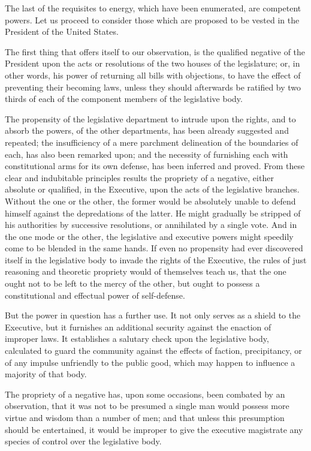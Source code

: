 The last of the requisites to energy, which have been enumerated, are competent powers. 
Let us proceed to consider those which are proposed to be vested in the President of the United States.

The first thing that offers itself to our observation, is the qualified negative of the President upon the acts or resolutions of the two houses of the legislature; or, in other words, his power of returning all bills with objections, to have the effect of preventing their becoming laws, unless they should afterwards be ratified by two thirds of each of the component members of the legislative body.

The propensity of the legislative department to intrude upon the rights, and to absorb the powers, of the other departments, has been already suggested and repeated; the insufficiency of a mere parchment delineation of the boundaries of each, has also been remarked upon; and the necessity of furnishing each with constitutional arms for its own defense, has been inferred and proved. 
From these clear and indubitable principles results the propriety of a negative, either absolute or qualified, in the Executive, upon the acts of the legislative branches. 
Without the one or the other, the former would be absolutely unable to defend himself against the depredations of the latter. 
He might gradually be stripped of his authorities by successive resolutions, or annihilated by a single vote. 
And in the one mode or the other, the legislative and executive powers might speedily come to be blended in the same hands. 
If even no propensity had ever discovered itself in the legislative body to invade the rights of the Executive, the rules of just reasoning and theoretic propriety would of themselves teach us, that the one ought not to be left to the mercy of the other, but ought to possess a constitutional and effectual power of self-defense.

But the power in question has a further use. 
It not only serves as a shield to the Executive, but it furnishes an additional security against the enaction of improper laws. 
It establishes a salutary check upon the legislative body, calculated to guard the community against the effects of faction, precipitancy, or of any impulse unfriendly to the public good, which may happen to influence a majority of that body.

The propriety of a negative has, upon some occasions, been combated by an observation, that it was not to be presumed a single man would possess more virtue and wisdom than a number of men; and that unless this presumption should be entertained, it would be improper to give the executive magistrate any species of control over the legislative body.

